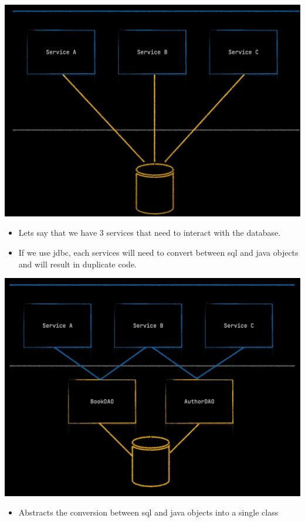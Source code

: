 \documentclass[10pt, landscape]{article}
\begin{document}
\begin{multicols*}{2}
\begin{itemize}
  \includegraphics[width=\linewidth/2]{originalnodao.png}
  \begin{itemize}
    \item Lets say that we have 3 services that need to interact with the database.
    \item If we use jdbc, each services will need to convert between sql and java objects and will result in duplicate code.
  \end{itemize}
\includegraphics[width=\linewidth/2]{dao.png}
\begin{itemize}
  \item Abstracts the conversion between sql and java objects into a single class
\end{itemize}

\end{itemize}
\end{multicols*}
\end{document}
